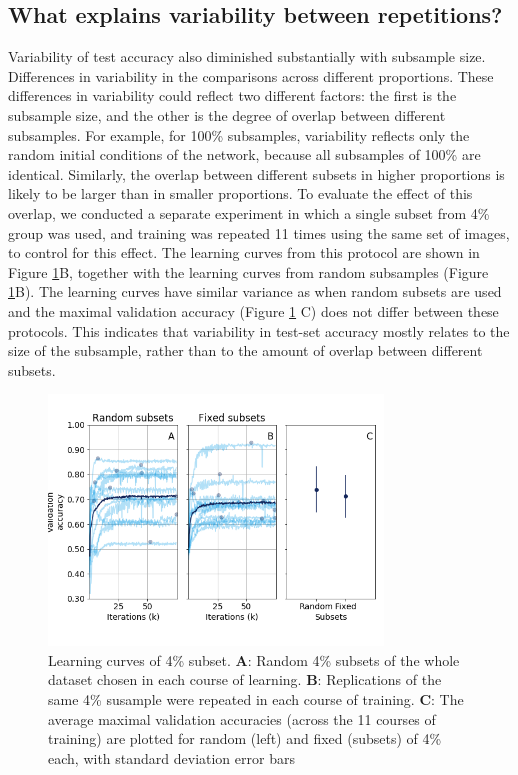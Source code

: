 \subsection{What explains variability between repetitions?}

Variability of test accuracy also diminished substantially with subsample size.
Differences in variability in the comparisons across different proportions.
These differences in variability could reflect two different factors: the first
is the subsample size, and the other is the degree of overlap between different
subsamples. For example, for 100\% subsamples, variability reflects only the
random initial conditions of the network, because all subsamples of 100\% are
identical.  Similarly, the overlap between different subsets in higher
proportions is likely to be larger than in smaller proportions. To evaluate the
effect of this overlap, we conducted a separate experiment in which a single
subset from 4\% group was used, and training was repeated 11 times using the
same set of images, to control for this effect. The learning curves from this
protocol are shown in Figure \ref{fig_fourpercent}B, together with the
learning curves from random subsamples (Figure \ref{fig_fourpercent}B). The
learning curves have similar variance as when random subsets are used and the
maximal validation accuracy (Figure \ref{fig_fourpercent} C) does not differ
between these protocols. This indicates that variability in test-set accuracy
mostly relates to the size of the subsample, rather than to the amount of
overlap between different subsets.

\begin{figure}[!t]
\centering
\includegraphics[width=3.5in]{./figures/fourpercent}

\caption{Learning curves of 4\% subset. {\bf A}: Random 4\% subsets of the whole
dataset chosen in each course of learning. {\bf B}: Replications of the same 4\%
susample were repeated in each course of training. {\bf C}: The average maximal
validation accuracies (across the 11 courses of training) are plotted for random
(left) and fixed (subsets) of 4\% each, with standard deviation error bars}

\label{fig_fourpercent}
\end{figure}

